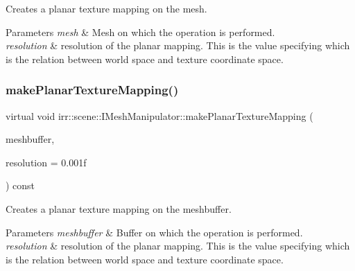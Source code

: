 Creates a planar texture mapping on the mesh. 


\begin{DoxyParams}{Parameters}
{\em mesh} & Mesh on which the operation is performed. \\
\hline
{\em resolution} & resolution of the planar mapping. This is the value specifying which is the relation between world space and texture coordinate space. \\
\hline
\end{DoxyParams}
\mbox{\label{classirr_1_1scene_1_1IMeshManipulator_a757511833420a24ed8cbf4dfd6607143}} 
\subsubsection{\texorpdfstring{make\+Planar\+Texture\+Mapping()}{makePlanarTextureMapping()}\hspace{0.1cm}{\footnotesize\ttfamily [2/4]}}
{\footnotesize\ttfamily virtual void irr\+::scene\+::\+I\+Mesh\+Manipulator\+::make\+Planar\+Texture\+Mapping (\begin{DoxyParamCaption}\item[{\hyperlink{classirr_1_1scene_1_1IMeshBuffer}{scene\+::\+I\+Mesh\+Buffer} $\ast$}]{meshbuffer,  }\item[{\hyperlink{namespaceirr_a0277be98d67dc26ff93b1a6a1d086b07}{f32}}]{resolution = {\ttfamily 0.001f} }\end{DoxyParamCaption}) const\hspace{0.3cm}{\ttfamily [pure virtual]}}



Creates a planar texture mapping on the meshbuffer. 


\begin{DoxyParams}{Parameters}
{\em meshbuffer} & Buffer on which the operation is performed. \\
\hline
{\em resolution} & resolution of the planar mapping. This is the value specifying which is the relation between world space and texture coordinate space. \\
\hline
\end{DoxyParams}
\mbox{\label{classirr_1_1scene_1_1IMeshManipulator_abc1b4ae56f126e8466ba6f6634a0f723}} 
